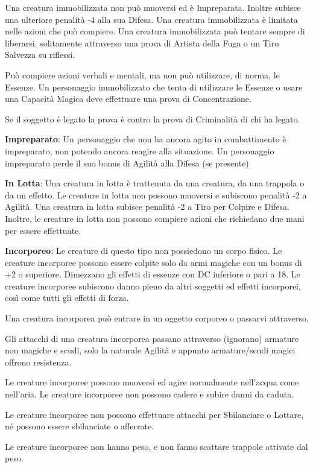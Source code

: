 \documentclass[a4paper,11pt,twoside,openany]{book}
\begin{document}
Una creatura immobilizzata non può muoversi ed è Impreparata. Inoltre subisce una ulteriore penalità -4 alla sua Difesa. Una creatura immobilizzata è limitata nelle azioni che può compiere. Una creatura immobilizzata può tentare sempre di liberarsi, solitamente attraverso una prova di Artista della Fuga o un Tiro Salvezza su riflessi.

Può compiere azioni verbali e mentali, ma non può utilizzare, di norma, le Essenze. Un personaggio immobilizzato che tenta di utilizzare le Essenze o usare una Capacità Magica deve effettuare una prova di Concentrazione.

Se il soggetto è legato la prova è contro la prova di Criminalità di chi ha legato.

\textbf{Impreparato}: Un personaggio che non ha ancora agito in combattimento è impreparato, non potendo ancora reagire alla situazione. Un personaggio impreparato perde il suo bonus di Agilità alla Difesa (se presente)

\textbf{In Lotta}: Una creatura in lotta è trattenuta da una creatura,
da una trappola o da un effetto. Le creature in lotta non possono
muoversi e subiscono penalità -2 a Agilità. Una creatura in lotta
subisce penalità -2 a Tiro per Colpire e Difesa. Inoltre, le creature
in lotta non possono compiere azioni che richiedano due mani per essere
effettuate.

\textbf{Incorporeo}: Le creature di questo tipo non possiedono un corpo fisico. Le creature incorporee possono essere colpite solo da armi magiche con un bonus di +2 o superiore. Dimezzano gli effetti di essenze con DC inferiore o pari a 18. Le creature incorporee subiscono danno pieno da altri soggetti ed effetti incorporei, così come tutti gli effetti di forza.

Una creatura incorporea può entrare in un oggetto corporeo o passarvi attraverso,

Gli attacchi di una creatura incorporea passano attraverso (ignorano) armature non magiche e scudi, solo la naturale Agilità e appunto armature/scudi magici offrono resistenza.

Le creature incorporee possono muoversi ed agire normalmente nell'acqua come nell'aria. Le creature incorporee non possono cadere e subire danni da caduta.

Le creature incorporee non possono effettuare attacchi per Sbilanciare o Lottare, né possono essere sbilanciate o afferrate.

Le creature incorporee non hanno peso, e non fanno scattare trappole attivate dal peso.
\end{document}
